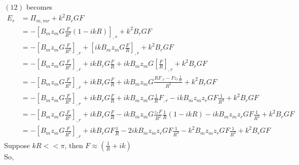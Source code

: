 $(12)$ becomes
\begin{align}
E_r&= \Pi_{m,mr}+k^2B_rGF\\
&= -\left[B_mz_mG\frac{F}{R^2}\left(1-ikR\right)\right]_{,r}+k^2B_rGF\\
&= -\left[B_mz_mG\frac{F}{R^2}\right]_{,r}+\left[ikB_mz_mG\frac{F}{R}\right]_{,r}+k^2B_rGF\\
&= -\left[B_mz_mG\frac{F}{R^2}\right]_{,r}+ikB_rG\frac{F}{R}+ikB_mz_mG\left[\frac{F}{R}\right]_{,r}+k^2B_rGF\\
&= -\left[B_mz_mG\frac{F}{R^2}\right]_{,r}+ikB_rG\frac{F}{R}+ikB_mz_mG\frac{RF_{,r}-Fz_r\frac{1}{R}}{R^2}+k^2B_rGF\\
&= -\left[B_mz_mG\frac{F}{R^2}\right]_{,r}+ikB_rG\frac{F}{R}+ikB_mz_mG\frac{1}{R}F_{,r}-ikB_mz_mz_rGF\frac{1}{R^3}+k^2B_rGF\\
&= -\left[B_mz_mG\frac{F}{R^2}\right]_{,r}+ikB_rG\frac{F}{R}-ikB_mz_mG\frac{z_rF}{R^2}\frac{1}{R}\left(1-ikR\right)-ikB_mz_mz_rGF\frac{1}{R^3}+k^2B_rGF\\
&= -\left[B_mz_mG\frac{F}{R^2}\right]_{,r}+ikB_rGF\frac{1}{R}-2ikB_mz_mz_rGF\frac{1}{R^3}-k^2B_mz_mz_rGF\frac{1}{R^2}+k^2B_rGF
\end{align}
Suppose $kR << \pi$, then $F\approx \left(\frac{1}{R} + ik\right)$\\
So, 
